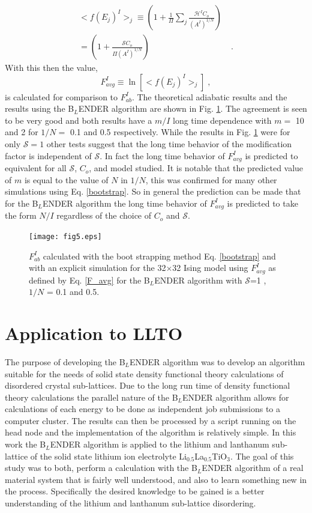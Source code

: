 \documentclass[aps,pre,reprint,superscriptaddress,showkeys]{revtex4-2}
\begin{document}
\begin{equation}
\begin{split}
 <f(E_j)^I>_j  \equiv (1 + \frac{1}{\Pi}\sum_j\frac{\mathcal{H}^IC_o}{(A^I)^{1/N}})\\
 = (1 + \frac{\mathcal{S}C_o}{\Pi(A^I)^{1/N}})& \;.
 \end{split}
 \label{calcmodfactor}
 \end{equation} 
  With this then the value,
 \begin{equation}
  F_{avg}^I\equiv \ln[<f(E_j)^I>_j]\;,
  \label{F_avg}
  \end{equation}
  is  calculated for comparison to $F_{ab}^I$.   The theoretical adiabatic results and the results using the B$_L$ENDER algorithm are shown in Fig. \ref{fcalcs}.   The agreement is seen to be very good and both results have a $m/I$ long time dependence with $m=$ 10 and 2  for $1/N=$ 0.1 and 0.5 respectively. While the results in Fig. \ref{fcalcs} were for only $\mathcal{S}=1$ other tests suggest that the long time behavior of the modification factor is independent of $\mathcal{S}$. In fact the long time behavior of $F_{avg}^I$ is predicted to equivalent for all $\mathcal{S}$, $C_o$,  and model studied.  It is notable that the predicted value of $m$ is equal to the value of $N$ in $1/N$, this was confirmed for many other simulations using Eq. \ref{bootstrap}. So in general the prediction can be made that for the B$_L$ENDER algorithm the long time behavior of $F_{avg}^I$ is predicted to take the form $N/I$ regardless of the choice of $C_o$ and $\mathcal{S}$. 
\begin{figure}
\texttt{[image: fig5.eps]}
\caption{$F_{ab}^I$ calculated with the boot strapping method Eq. \ref{bootstrap} and with an explicit simulation for the 32$\times$32 Ising model using $F_{avg}^I$ as defined by Eq. \ref{F_avg} for the B$_L$ENDER algorithm with $\mathcal{S}$=1 , $1/N$ = 0.1  and 0.5.            \label{fcalcs}}
\end{figure}

\section{Application to LLTO}
\label{sec4}
The purpose of developing the B$_L$ENDER algorithm was to develop an algorithm suitable for the needs of solid state density functional theory calculations of disordered crystal sub-lattices.  Due to the long run time of density functional theory calculations  the parallel nature of the B$_L$ENDER algorithm allows for calculations of each energy to be done as independent job submissions to a computer cluster. The results can then be processed by a script running on the head node and the implementation of the algorithm is relatively simple.  In this work the B$_L$ENDER algorithm is applied to the lithium and lanthanum sub-lattice of the solid state lithium ion electrolyte  Li$_{0.5}$La$_{0.5}$TiO$_{3}$. The goal of this study was to both, perform a calculation with the B$_L$ENDER algorithm  of a real material system that is fairly well understood, and also to learn something new in the process.  Specifically the desired knowledge to be gained is a better understanding of the lithium and lanthanum sub-lattice disordering. 
\end{document}
